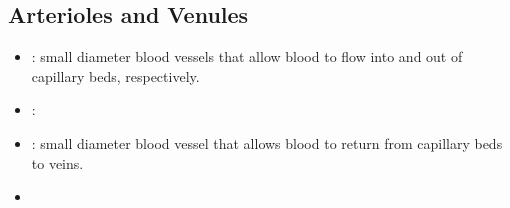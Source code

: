 \begin{itemize}
\begin{itemize}
  \end{itemize}

  \newpage
  \subsection{Arterioles and Venules}
  \begin{multicols}{2}
  \begin{itemize}
    \item {}: small diameter blood vessels that allow blood to flow into and out of capillary beds, respectively.
    
    \begin{center}
    \end{center}

    \item {}: 
    
    \begin{center}
    \end{center}
    
    \item {}: small diameter blood vessel that allows blood to return from capillary beds to veins.
    
    \begin{center}
    \end{center}
    
    \item {}
    
    \begin{center}
    \end{center}
  
  \end{itemize}
  \end{multicols}
\end{itemize}

\newpage
